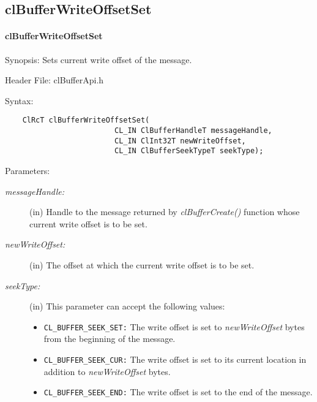 \subsection{clBufferWriteOffsetSet}
\hypertarget{pagebuf120}{}\paragraph{cl\-Buffer\-Write\-Offset\-Set}\label{pagebuf120}
\begin{Desc}
\item[Synopsis:]Sets current write offset of the message.\end{Desc}
\begin{Desc}
\item[Header File:]clBufferApi.h\end{Desc}
\begin{Desc}
\item[Syntax:]

\footnotesize\begin{verbatim}    ClRcT clBufferWriteOffsetSet(
                         CL_IN ClBufferHandleT messageHandle,
                         CL_IN ClInt32T newWriteOffset,
                         CL_IN ClBufferSeekTypeT seekType);
\end{verbatim}
\normalsize
\end{Desc}
\begin{Desc}
\item[Parameters:]
\begin{description}
\item[{\em message\-Handle:}](in) Handle to the message returned by \textit{clBufferCreate()} function whose current write offset is to be set. 
\item[{\em new\-Write\-Offset:}](in) The offset at which the current write offset is to be set. \item[{\em seek\-Type:}](in) This parameter can accept the following
values: \begin{itemize}
\item {\tt CL\_\-BUFFER\_\-SEEK\_\-SET:} The write offset is set to {\em new\-Write\-Offset\/} bytes from the beginning of the message. \item {\tt CL\_\-BUFFER\_\-SEEK\_\-CUR:} The write offset is set to its current location in addition to {\em new\-Write\-Offset\/} bytes. \item {\tt CL\_\-BUFFER\_\-SEEK\_\-END:} The write offset is set to the end of the message.\end{itemize}
\end{description}
\end{Desc}
